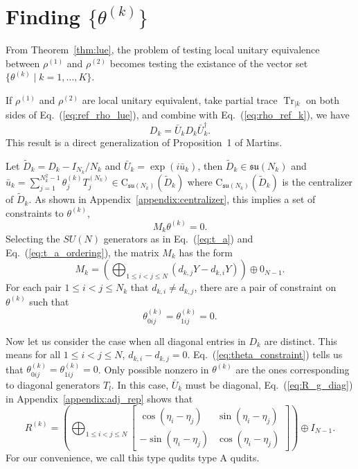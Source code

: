 \documentclass{article}
\DeclareMathOperator{\Tr}{Tr}
\begin{document}
\section{Finding \texorpdfstring{$\{\theta^{(k)}\}$}{theta.k}}
\label{sec:finding_theta}
From Theorem~\ref{thm:lue}, the problem of testing local unitary
equivalence between $\rho^{(1)}$ and $\rho^{(2)}$ becomes testing
the existance of the vector set $\{\theta^{(k)}\mid k = 1,\ldots,K\}$.

If $\rho^{(1)}$ and $\rho^{(2)}$ are local unitary equivalent, take
partial trace $\Tr_{|k}$ on both sides of Eq.~(\ref{eq:ref_rho_lue}),
and combine with Eq.~(\ref{eq:rho_ref_k}), we have
\begin{equation}
  D_k = \bar U_k D_k\bar U_k^\dagger.
\end{equation}
This result is a direct generalization of Proposition~1 of
Martins\cite{Martins_2015}.

Let $\tilde D_k = D_k-I_{N_k}/N_k$ and $\bar U_k = \exp(i\bar u_k)$, then
$\tilde D_k\in \mathfrak{su}(N_k)$ and
$\bar u_k = \sum_{j=1}^{N_k^2-1}\theta^{(k)}_jT^{(N_k)}_j\in
\text{C}_{\mathfrak{su}(N_k)}(\tilde D_k)$ where
$\text{C}_{\mathfrak{su}(N_k)}(\tilde D_k)$
is the centralizer of $\tilde D_k$.  As shown in
Appendix~\ref{appendix:centralizer}, this implies a set of constraints to
$\theta^{(k)}$,
\begin{equation}
  \label{eq:theta_con}
  M_k\theta^{(k)} = 0.
\end{equation}
Selecting the $SU(N)$ generators as in Eq.~(\ref{eq:t_a}) and
Eq.~(\ref{eq:t_a_ordering}), the matrix $M_k$ has the form
\begin{equation}
  \label{eq:M_k}
  M_k = \left(\bigoplus_{1\le i<j\le N}(d_{k,j}Y-d_{k,i}Y)\right)\oplus0_{N-1}.
\end{equation}
For each pair $1 \le i < j \le N_k$ that $d_{k,i} \ne d_{k,j}$, there
are a pair of constraint on $\theta^{(k)}$ such that
\begin{equation}
  \label{eq:theta_constraint}
  \theta^{(k)}_{0ij} = \theta^{(k)}_{1ij} = 0.
\end{equation}

Now let us consider the case when all diagonal entries in $D_k$ are distinct.
This means for all
$1 \le i < j \le N$, $d_{k,i}-d_{k,j} = 0.$  Eq.~(\ref{eq:theta_constraint})
tells us that $\theta^{(k)}_{0ij} = \theta^{(k)}_{1ij} = 0$.  Only possible
nonzero in $\theta^{(k)}$ are the ones corresponding to diagonal generators
$T_l$.  In this case, $\bar U_k$ must be diagonal, Eq.~(\ref{eq:R_g_diag})
in Appendix~\ref{appendix:adj_rep} shows that
\begin{equation}
  \label{eq:R_type_A}
  R^{(k)} = \left(\bigoplus_{1\le i < j \le N}
  \begin{bmatrix}
    \cos(\eta_i-\eta_j) & \sin(\eta_i-\eta_j) \\
    -\sin(\eta_i-\eta_j) & \cos(\eta_i-\eta_j)
  \end{bmatrix}\right)
  \oplus I_{N-1}.
\end{equation}
For our convenience, we call this type qudits type A qudits.
\end{document}

